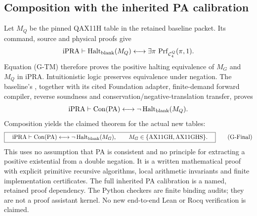 \subsection{Composition with the inherited PA calibration}

Let $M_Q$ be the pinned QAX11H table in the retained baseline packet.
Its command, source and physical proofs give
\[
 \mathrm{iPRA}\vdash
 \operatorname{Halt}_{\rm blank}(M_Q)
 \longleftrightarrow
       \exists\pi\,\operatorname{Prf}_{\mathcal C_4^Q}(\pi,1).
\]
Equation (G-TM) therefore proves the positive halting equivalence of
$M_G$ and $M_Q$ in iPRA.  Intuitionistic logic preserves equivalence
under negation.  The baseline's
, together with its cited
Foundation adapter, finite-demand forward compiler, reverse soundness
and conservation/negative-translation transfer, proves
\[
 \mathrm{iPRA}\vdash
 \operatorname{Con}(\mathrm{PA})
       \longleftrightarrow\neg\operatorname{Halt}_{\rm blank}(M_Q).
\]
Composition yields the claimed theorem for the actual new tables:
\[
 \boxed{\quad
 \mathrm{iPRA}\vdash
 \operatorname{Con}(\mathrm{PA})
       \longleftrightarrow\neg\operatorname{Halt}_{\rm blank}(M_G),
 \qquad M_G\in\{\mathrm{AX11GH},\mathrm{AX11GHS}\}.
 \quad}                                                    \tag{G-Final}
\]
This uses no assumption that PA is consistent and no principle for
extracting a positive existential from a double negation.  It is a
written mathematical proof with explicit primitive recursive algorithms,
local arithmetic invariants and finite implementation certificates.
The full inherited PA calibration is a named, retained proof dependency.
The Python checkers are finite binding audits; they are not a proof
assistant kernel.  No new end-to-end Lean or Rocq verification is claimed.
